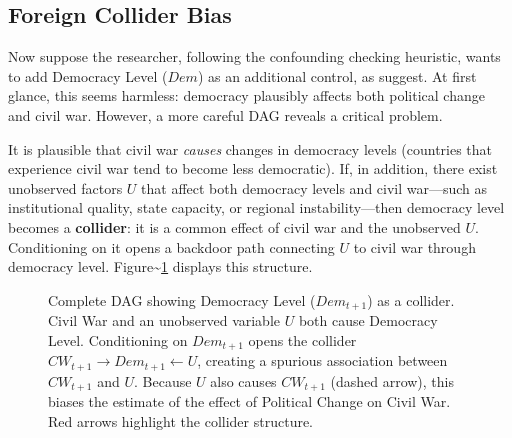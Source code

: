 \documentclass[
]{article}
\begin{document}
\subsection{Foreign Collider Bias}\label{foreign-collider-bias}

Now suppose the researcher, following the confounding checking
heuristic, wants to add Democracy Level (\(Dem\)) as an additional
control, as \citet{hegre2001toward} suggest. At first glance, this seems
harmless: democracy plausibly affects both political change and civil
war. However, a more careful DAG reveals a critical problem.

It is plausible that civil war \emph{causes} changes in democracy levels
(countries that experience civil war tend to become less democratic).
If, in addition, there exist unobserved factors \(U\) that affect both
democracy levels and civil war---such as institutional quality, state
capacity, or regional instability---then democracy level becomes a
\textbf{collider}: it is a common effect of civil war and the unobserved
\(U\). Conditioning on it opens a backdoor path connecting \(U\) to
civil war through democracy level.
Figure\textasciitilde{}\ref{fig:dag_collider} displays this structure.

\begin{figure}[H]
\centering
{}
\caption{Complete DAG showing Democracy Level ($Dem_{t+1}$) as a collider. Civil War and an unobserved variable $U$ both cause Democracy Level. Conditioning on $Dem_{t+1}$ opens the collider $CW_{t+1} \to Dem_{t+1} \leftarrow U$, creating a spurious association between $CW_{t+1}$ and $U$. Because $U$ also causes $CW_{t+1}$ (dashed arrow), this biases the estimate of the effect of Political Change on Civil War. Red arrows highlight the collider structure.}
\label{fig:dag_collider}
\end{figure}
\end{document}
